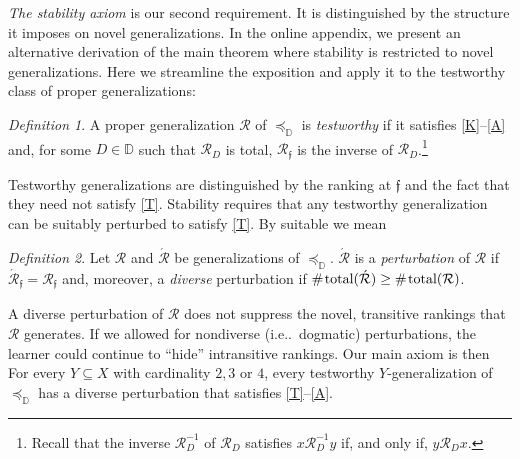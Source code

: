 \documentclass[ecta,nameyear,draft]{econsocart}
\makeatletter
\newcommand{\countof}{\mathbin{\#}\hskip1pt}
\newcommand{\mc}{\mathcal}
\newcommand{\novel}{\mathfrak f}
\newcommand{\preceqb}{\mathbin{\preceq}}
\newcommand{\ext}{\mathrel{\mc R}}
\newcommand{\extb}{\mathbin{\mc R}}
\newcommand{\hextb}{\mathbin{\hat{\mathbin{\mathcal R}}}}
\newcommand{\aext}{\mathrel{\acute{\mathrel{\mathcal R}}}}
\newcommand{\aextb}{\mathbin{\acute{\mathbin{\mathcal R}}}}
\newcommand{\total}{\textup{total}}
\newcommand{\mbbd}{{\mathds D}}
\newcommand\ie{i\@.e\@ifnextchar.{}{.\@}}
\theoremstyle{plain}
\newenvironment{taggedstability}[1]
 {\renewcommand\thetaggedtheoremx{#1}\taggedtheoremx}
 {\endtaggedtheoremx}
\theoremstyle{remark}
\newtheorem*{definition*}{Definition}
\makeatother
\begin{document}
\emph{The {stability} axiom } is our second requirement. It is distinguished by
the structure it imposes on novel generalizations. In the online appendix, we
present an alternative derivation of the main theorem where stability is
restricted to novel generalizations. Here we streamline the exposition and
apply it to the testworthy class of proper generalizations:
\begin{definition*}\label{def-testworthy} A proper generalization $\ext$ of
  $\preceqb_{\mbbd}$ is \emph{testworthy} if it satisfies
  \textup{\ref{K}--\ref{A}} and, for some $D\in \mbbd$ such that $\ext_{D}$ is
  total, $\extb _{\novel}$ is the inverse of $\extb_{D}$.\footnote{Recall that
    the inverse $\ext _{D}^{- 1}$ of $\ext
    _{D}$ satisfies $x \ext _{D}^{- 1} y$ if, and only if, $y \ext _{D}
  x$.}
\end{definition*}

Testworthy generalizations are distinguished by the ranking at $\novel$ and the
fact that they need not satisfy \ref{T}.  Stability requires that any
testworthy generalization can be suitably perturbed to satisfy \ref{T}. By
suitable we mean
\begin{definition*} Let $\ext$ and $\aext$ be generalizations of
  $\preceqb_{\mbbd}$. $\aext$ is a \emph{perturbation} of $\ext$ if
  $\aextb_{\novel} = \extb_{\novel}$ and, moreover, a \emph{{{diverse}}}
  perturbation if $\countof \total (\aextb) \geq \countof \total ( \extb)$.
\end{definition*}
A diverse perturbation of $\ext$ does not suppress the novel, transitive
rankings that $\ext$ generates. If we allowed for nondiverse (\ie\ dogmatic)
perturbations, the learner could continue to ``hide'' intransitive rankings.
Our main axiom is then
\begin{taggedstability}{\textsc{4stability}}\label{S} For every $Y\subseteq X$
  with cardinality $2, 3$ or $4$, every testworthy $Y$-generalization of
  $\preceqb _{\mbbd}$ has a {{diverse}} perturbation that satisfies
  \ref{T}–\ref{A}.
\end{taggedstability}
\end{document}
